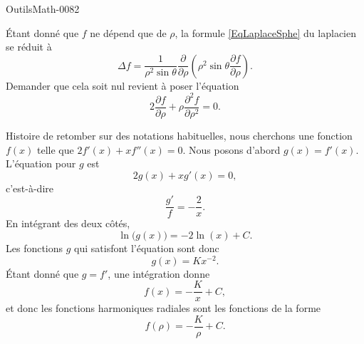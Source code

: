 
\begin{corrige}{OutilsMath-0082}

    Étant donné que $f$ ne dépend que de $\rho$, la formule \eqref{EqLaplaceSphe} du laplacien se réduit à
    \begin{equation}
        \Delta f=\frac{1}{ \rho^2\sin\theta }\frac{ \partial  }{ \partial \rho }\left( \rho^2\sin\theta\frac{ \partial f }{ \partial \rho } \right).
    \end{equation}
    Demander que cela soit nul revient à poser l'équation
    \begin{equation}
        2\frac{ \partial f }{ \partial \rho }+\rho\frac{ \partial^2f }{ \partial \rho^2 }=0.
    \end{equation}
    
    Histoire de retomber sur des notations habituelles, nous cherchons une fonction $f(x)$ telle que $2f'(x)+xf''(x)=0$. Nous posons d'abord $g(x)=f'(x)$. L'équation pour $g$ est
    \begin{equation}
        2g(x)+xg'(x)=0,
    \end{equation}
    c'est-à-dire
    \begin{equation}
        \frac{ g' }{ f }=-\frac{ 2 }{ x }.
    \end{equation}
    En intégrant des deux côtés,
    \begin{equation}
        \ln\big( g(x) \big)=-2\ln(x)+C.
    \end{equation}
    Les fonctions $g$ qui satisfont l'équation sont donc
    \begin{equation}
        g(x)=Kx^{-2}.
    \end{equation}
    Étant donné que $g=f'$, une intégration donne
    \begin{equation}
        f(x)=-\frac{ K }{ x }+C,
    \end{equation}
    et donc les fonctions harmoniques radiales sont les fonctions de la forme
    \begin{equation}
        f(\rho)=-\frac{ K }{ \rho }+C.
    \end{equation}

\end{corrige}
